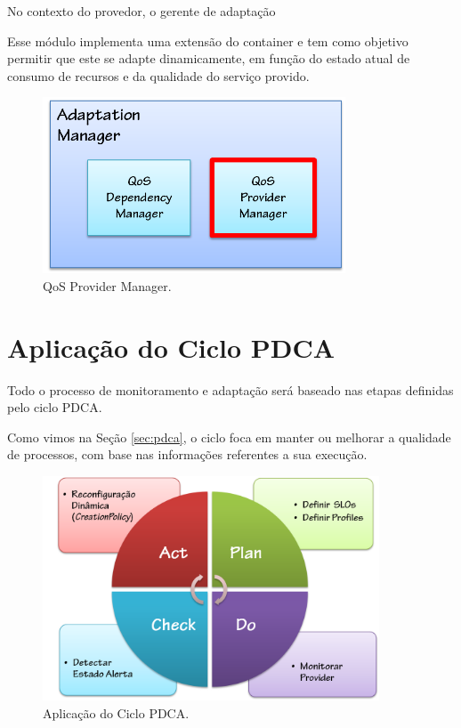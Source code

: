 No contexto do provedor, o gerente de adaptação

Esse módulo implementa uma extensão do container e tem como objetivo permitir que este se adapte dinamicamente, em função do estado atual de consumo de recursos e da qualidade do serviço provido. 



\begin{figure}[htp]
\centering
\includegraphics[width=9cm]{chapters/chapter4/adaptation-manager.png}
\caption[QoS Provider Manager]{QoS Provider Manager.}
\label{fig:adapt_module}
\end{figure}



\section{Aplicação do Ciclo PDCA}
Todo o processo de monitoramento e adaptação será baseado nas etapas definidas pelo ciclo PDCA.

Como vimos na Seção \ref{sec:pdca}, o ciclo foca em manter ou melhorar a qualidade de processos, com base nas informações referentes a sua execução.

\begin{figure}[htp]
\centering
\includegraphics[width=10cm]{chapters/chapter4/pdca_actions.png}
\caption[Aplicação do Ciclo PDCA]{Aplicação do Ciclo PDCA.}
\label{fig:pdcamapping}
\end{figure}


